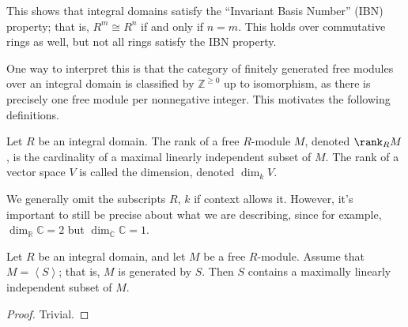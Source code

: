 This shows that integral domains satisfy the ``Invariant Basis Number'' (IBN) property; that is, $R^m\cong R^n$ if and only if $n=m$. This holds over commutative rings as well, but not all rings satisfy the IBN property.

One way to interpret this is that the category of finitely generated free modules over an integral domain is classified by $\mathbb{Z} ^{\geq 0} $ up to isomorphism, as there is precisely one free module per nonnegative integer. This motivates the following definitions.
\begin{definition}\label{dfn:6.3}
	Let $R$ be an integral domain. The rank of a free $R$-module $M$, denoted $\rank _R M$, is the cardinality of a maximal linearly independent subset of $M$. The rank of a vector space $V$ is called the dimension, denoted $\dim_k V$.
\end{definition}

We generally omit the subscripts $R$, $k$ if context allows it. However, it's important to still be precise about what we are describing, since for example, $\dim_{\mathbb{R} } \mathbb{C} =2$ but $\dim_\mathbb{C} \mathbb{C} =1$.

\begin{proposition}\label{prp:6.3}
	Let $R$ be an integral domain, and let $M$ be a free $R$-module. Assume that $M=\left\langle S \right\rangle $; that is, $M$ is generated by $S$. Then $S$ contains a maximally linearly independent subset of $M$.
\end{proposition}
\begin{proof}
	Trivial.
\end{proof}
